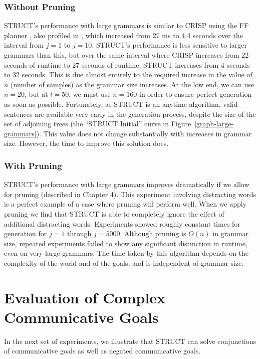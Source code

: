 \subsubsection{Without Pruning}

STRUCT's performance with large grammars is similar to CRISP using the
FF planner \cite{hoffmann_ff_2001}, also profiled in
\cite{koller_experiences_2011}, which increased from 27 ms to 4.4
seconds over the interval from $j = 1$ to $j = 10$.  STRUCT's
performance is less sensitive to larger grammars than this, but over
the same interval where CRISP increases from 22 seconds of runtime to
27 seconds of runtime, STRUCT increases from 4 seconds to 32 seconds.
This is due almost entirely to the required increase in the value of
$n$ (number of samples) as the grammar size increases.  At the low
end, we can use $n=20$, but at $l = 50$, we must use $n = 160$ in
order to ensure perfect generation as soon as possible.  Fortunately,
as STRUCT is an anytime algorithm, valid sentences are available very
early in the generation process, despite the size of the set of
adjoining trees (the ``STRUCT Initial'' curve in
Figure~\ref{graph-large-grammars}).  This value does not change
substantially with increases in grammar size.  However, the time to
improve this solution does.

\subsubsection{With Pruning}

STRUCT's performance with large grammars improves dramatically if
we allow for pruning (described in Chapter 4).  This experiment involving distracting words
is a perfect example of a case where pruning will perform well.
When we apply pruning we find that STRUCT is able to completely ignore the effect of
additional distracting words.  Experiments showed roughly constant times for generation
for $j=1$ through $j=5000$.  Although pruning is $O(n)$ in grammar size, repeated experiments
failed to show any significant distinction in runtime, even on very large grammars.  The time
taken by this algorithm depends on the complexity of the world and of the goals, and is independent
of grammar size.

\section{Evaluation of Complex Communicative Goals}
In the next set of experiments, we illustrate that STRUCT can solve
conjunctions of communicative goals as well as negated communicative goals.

